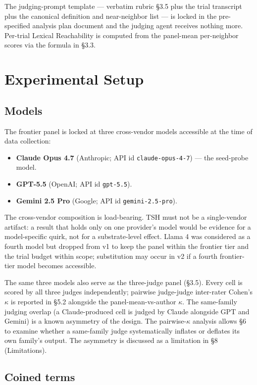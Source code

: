 \documentclass[11pt,a4paper]{article}
\begin{document}
The judging-prompt template --- verbatim rubric \S3.5 plus the trial transcript plus the canonical definition and near-neighbor list --- is locked in the pre-specified analysis plan document and the judging agent receives nothing more. Per-trial Lexical Reachability is computed from the panel-mean per-neighbor scores via the formula in \S3.3.

\section{Experimental Setup}

\subsection{Models}

The frontier panel is locked at three cross-vendor models accessible at the time of data collection:

\begin{itemize}
  \item \textbf{Claude Opus 4.7} (Anthropic; API id \texttt{claude-opus-4-7}) --- the seed-probe model.
  \item \textbf{GPT-5.5} (OpenAI; API id \texttt{gpt-5.5}).
  \item \textbf{Gemini 2.5 Pro} (Google; API id \texttt{gemini-2.5-pro}).
\end{itemize}

The cross-vendor composition is load-bearing. TSH must not be a single-vendor artifact: a result that holds only on one provider's model would be evidence for a model-specific quirk, not for a substrate-level effect. Llama 4 was considered as a fourth model but dropped from v1 to keep the panel within the frontier tier and the trial budget within scope; substitution may occur in v2 if a fourth frontier-tier model becomes accessible.

The same three models also serve as the three-judge panel (\S3.5). Every cell is scored by all three judges independently; pairwise judge-judge inter-rater Cohen's $\kappa$ is reported in \S5.2 alongside the panel-mean-vs-author $\kappa$. The same-family judging overlap (a Claude-produced cell is judged by Claude alongside GPT and Gemini) is a known asymmetry of the design. The pairwise-$\kappa$ analysis allows \S6 to examine whether a same-family judge systematically inflates or deflates its own family's output. The asymmetry is discussed as a limitation in \S8 (Limitations).

\subsection{Coined terms}
\end{document}
